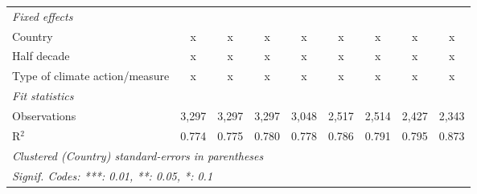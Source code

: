 \begin{table}[htbp]
\begin{tabular}{lcccccccc}
      \emph{Fixed effects}\\
      Country                                                                & x       & x       & x             & x             & x              & x              & x              & x\\  
      Half decade                                                            & x       & x       & x             & x             & x              & x              & x              & x\\  
      Type of climate action/measure                                         & x       & x       & x             & x             & x              & x              & x              & x\\  
      \midrule \emph{Fit statistics}\\
      Observations                                                           & 3,297   & 3,297   & 3,297         & 3,048         & 2,517          & 2,514          & 2,427          & 2,343\\  
      R$^2$                                                                  & 0.774   & 0.775   & 0.780         & 0.778         & 0.786          & 0.791          & 0.795          & 0.873\\  
      \midrule
      \multicolumn{9}{l}{\emph{Clustered (Country) standard-errors in parentheses}}\\
      \multicolumn{9}{l}{\emph{Signif. Codes: ***: 0.01, **: 0.05, *: 0.1}}\\
   \end{tabular}
\end{table}


